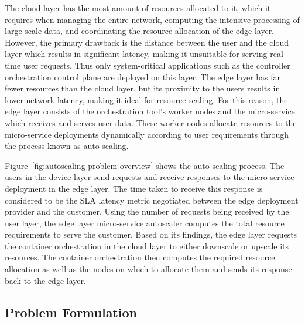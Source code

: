 The cloud layer has the most amount of resources allocated to it, which it requires when managing the entire network, computing the intensive processing of large-scale data, and coordinating the resource allocation of the edge layer. However, the primary drawback is the distance between the user and the cloud layer which results in significant latency, making it unsuitable for serving real-time user requests. Thus only system-critical applications such as the controller orchestration control plane are deployed on this layer. The edge layer has far fewer resources than the cloud layer, but its proximity to the users results in lower network latency, making it ideal for resource scaling. For this reason, the edge layer consists of the orchestration tool's worker nodes and the micro-service which receives and serves user data. These worker nodes allocate resources to the micro-service deployments dynamically according to user requirements through the process known as auto-scaling.\par

Figure~\ref{fig:autoscaling-problem-overview} shows the auto-scaling process. The users in the device layer send requests and receive responses to the micro-service deployment in the edge layer. The time taken to receive this response is considered to be the SLA latency metric negotiated between the edge deployment provider and the customer. Using the number of requests being received by the user layer, the edge layer micro-service autoscaler computes the total resource requirements to serve the customer. Based on its findings, the edge layer requests the container orchestration in the cloud layer to either downscale or upscale its resources. The container orchestration then computes the required resource allocation as well as the nodes on which to allocate them and sends its response back to the edge layer.\par

\subsection{Problem Formulation}
\label{subsec:ch4-problem-formulation}

